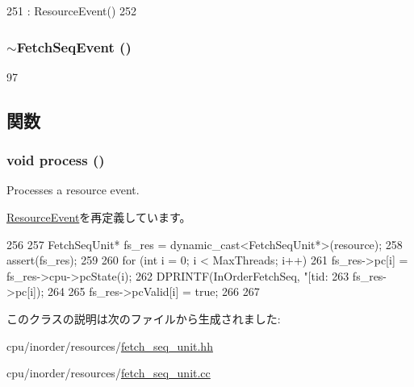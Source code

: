 \begin{DoxyCode}
251     : ResourceEvent()
252 { }
\end{DoxyCode}
\hypertarget{classFetchSeqUnit_1_1FetchSeqEvent_ae83ae0731d9882cc58d04be78282ec71}{
\subsubsection[{$\sim$FetchSeqEvent}]{\setlength{\rightskip}{0pt plus 5cm}$\sim${\bf FetchSeqEvent} ()}}
\label{classFetchSeqUnit_1_1FetchSeqEvent_ae83ae0731d9882cc58d04be78282ec71}



\begin{DoxyCode}
97 {}
\end{DoxyCode}


\subsection{関数}
\hypertarget{classFetchSeqUnit_1_1FetchSeqEvent_a2e9c5136d19b1a95fc427e0852deab5c}{
\subsubsection[{process}]{\setlength{\rightskip}{0pt plus 5cm}void process ()}}
\label{classFetchSeqUnit_1_1FetchSeqEvent_a2e9c5136d19b1a95fc427e0852deab5c}
Processes a resource event. 

\hyperlink{classResourceEvent_a2e9c5136d19b1a95fc427e0852deab5c}{ResourceEvent}を再定義しています。


\begin{DoxyCode}
256 {
257     FetchSeqUnit* fs_res = dynamic_cast<FetchSeqUnit*>(resource);
258     assert(fs_res);
259 
260     for (int i = 0; i < MaxThreads; i++) {
261         fs_res->pc[i] = fs_res->cpu->pcState(i);
262         DPRINTF(InOrderFetchSeq, "[tid:%
263                 fs_res->pc[i]);
264 
265         fs_res->pcValid[i] = true;
266     }
267 }
\end{DoxyCode}


このクラスの説明は次のファイルから生成されました:\begin{DoxyCompactItemize}
\item 
cpu/inorder/resources/\hyperlink{fetch__seq__unit_8hh}{fetch\_\-seq\_\-unit.hh}\item 
cpu/inorder/resources/\hyperlink{fetch__seq__unit_8cc}{fetch\_\-seq\_\-unit.cc}\end{DoxyCompactItemize}
